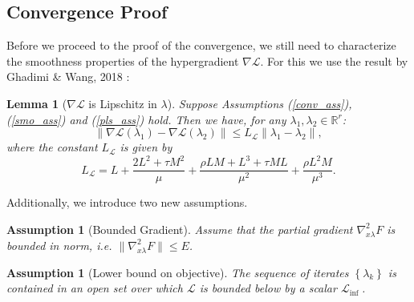 \documentclass[11pt, twoside]{report}
\newtheorem{assumption}[theorem]{Assumption}
\newtheorem{lemma}[theorem]{Lemma}
\begin{document}
\subsection{Convergence Proof}
Before we proceed to the proof of the convergence, we still need to characterize the smoothness properties of the hypergradient $\nabla \mathcal{L}.$ For this we use the result by Ghadimi \& Wang, 2018 \cite{ghadimi2018approximation}:
\begin{lemma}[$\nabla \mathcal{L}$ is Lipschitz in $\lambda$] \label{nab_lip}
Suppose Assumptions (\ref{conv_ass}), (\ref{smo_ass}) and (\ref{pls_ass}) hold. Then we have, for any $\lambda_1, \lambda_2 \in \mathbb{R}^r$:
\[\|\nabla \mathcal{L}(\lambda_1) - \nabla \mathcal{L}(\lambda_2)\| \leq L_{\mathcal{L}} \|\lambda_1 - \lambda_2\|,\]
where the constant $L_{\mathcal{L}}$ is given by
\[L_{\mathcal{L}} = L + \frac{2L^2 + \tau M^2}{\mu} + \frac{\rho L M + L^3 + \tau M L}{\mu^2} + \frac{\rho L^2 M}{\mu^3}.\]
\end{lemma}
Additionally, we introduce two new assumptions.
\begin{assumption}[Bounded Gradient] \label{nablaFxl_bnd}
    Assume that the partial gradient $\nabla_{x\lambda}^2 F$ is bounded in norm, i.e. $\|\nabla_{x\lambda}^2 F\| \leq E$.
\end{assumption}

\begin{assumption}[Lower bound on objective] \label{inf_ass}
    The sequence of iterates $\left\{\lambda_k\right\}$ is contained in an open set over which $\mathcal{L}$ is bounded below by a scalar $\mathcal{L}_{\text {inf }}$.
\end{assumption}
\end{document}
